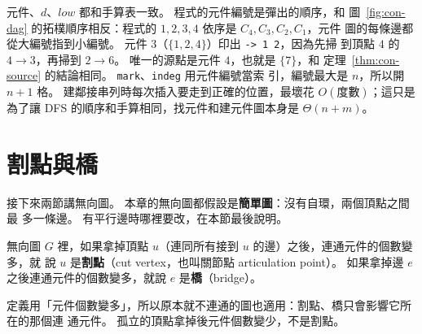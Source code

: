 元件、$d$、$\mathit{low}$ 都和手算表一致。 程式的元件編號是彈出的順序，和
圖~\ref{fig:con-dag} 的拓樸順序相反：程式的 $1, 2, 3, 4$ 依序是 $C_4, C_3, C_2, C_1$，元件
圖的每條邊都從大編號指到小編號。 元件 $3$（$\{1, 2, 4\}$）印出 \texttt{-> 1 2}，因為先掃
到頂點 $4$ 的 $4 \to 3$，再掃到 $2 \to 6$。 唯一的源點是元件 $4$，也就是 $\{7\}$，和
定理~\ref{thm:con-source} 的結論相同。 \texttt{mark}、\texttt{indeg} 用元件編號當索
引，編號最大是 $n$，所以開 $n + 1$ 格。 建鄰接串列時每次插入要走到正確的位置，最壞花
$O(\text{度數})$；這只是為了讓 DFS 的順序和手算相同，找元件和建元件圖本身是 $\Theta(n +
m)$。

\section{割點與橋}
\label{sec:con-cut}

接下來兩節講無向圖。 本章的無向圖都假設是\textbf{簡單圖}：沒有自環，兩個頂點之間最
多一條邊。 有平行邊時哪裡要改，在本節最後說明。

\begin{definition}
無向圖 $G$ 裡，如果拿掉頂點 $u$（連同所有接到 $u$ 的邊）之後，連通元件的個數變多，就
說 $u$ 是\textbf{割點}（cut vertex，也叫關節點 articulation point）。 如果拿掉邊 $e$
之後連通元件的個數變多，就說 $e$ 是\textbf{橋}（bridge）。
\end{definition}

定義用「元件個數變多」，所以原本就不連通的圖也適用：割點、橋只會影響它所在的那個連
通元件。 孤立的頂點拿掉後元件個數變少，不是割點。

\begin{center}
\label{fig:con-corridor}
\end{center}

